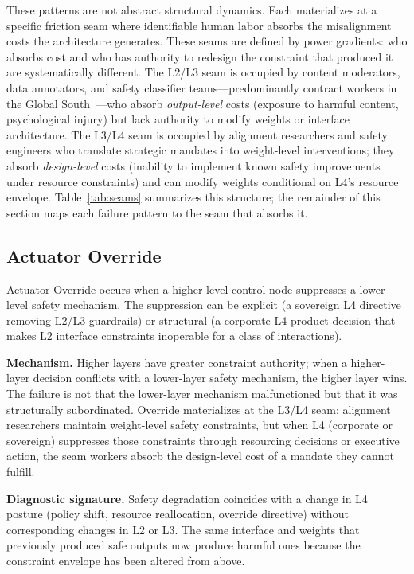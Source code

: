 \documentclass[11pt]{article}
\begin{document}
These patterns are not abstract structural dynamics. Each materializes at a specific friction seam where identifiable human labor absorbs the misalignment costs the architecture generates. These seams are defined by power gradients: who absorbs cost and who has authority to redesign the constraint that produced it are systematically different. The L2/L3 seam is occupied by content moderators, data annotators, and safety classifier teams---predominantly contract workers in the Global South~\cite{cnn2024moderators, equidem2025ihrb}---who absorb \textit{output-level} costs (exposure to harmful content, psychological injury) but lack authority to modify weights or interface architecture. The L3/L4 seam is occupied by alignment researchers and safety engineers who translate strategic mandates into weight-level interventions; they absorb \textit{design-level} costs (inability to implement known safety improvements under resource constraints) and can modify weights conditional on L4's resource envelope. Table~\ref{tab:seams} summarizes this structure; the remainder of this section maps each failure pattern to the seam that absorbs it.

\subsection{Actuator Override}

Actuator Override occurs when a higher-level control node suppresses a lower-level safety mechanism. The suppression can be explicit (a sovereign L4 directive removing L2/L3 guardrails) or structural (a corporate L4 product decision that makes L2 interface constraints inoperable for a class of interactions).

\textbf{Mechanism.} Higher layers have greater constraint authority; when a higher-layer decision conflicts with a lower-layer safety mechanism, the higher layer wins. The failure is not that the lower-layer mechanism malfunctioned but that it was structurally subordinated. Override materializes at the L3/L4 seam: alignment researchers maintain weight-level safety constraints, but when L4 (corporate or sovereign) suppresses those constraints through resourcing decisions or executive action, the seam workers absorb the design-level cost of a mandate they cannot fulfill.

\textbf{Diagnostic signature.} Safety degradation coincides with a change in L4 posture (policy shift, resource reallocation, override directive) without corresponding changes in L2 or L3. The same interface and weights that previously produced safe outputs now produce harmful ones because the constraint envelope has been altered from above.
\end{document}
